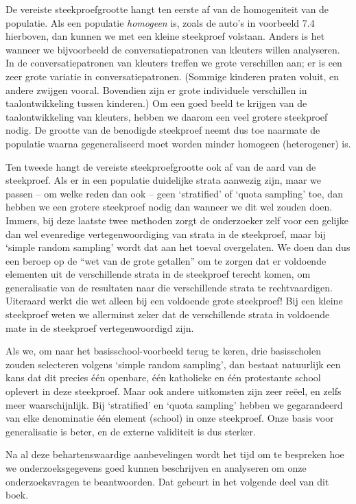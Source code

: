 \documentclass[
]{book}
\begin{document}
De vereiste steekproefgrootte hangt ten eerste af van de homogeniteit
van de populatie. Als een populatie \emph{homogeen} is, zoals de auto's in
voorbeeld 7.4 hierboven, dan kunnen we met een kleine
steekproef volstaan. Anders is het wanneer we bijvoorbeeld de
conversatiepatronen van kleuters willen analyseren. In de
conversatiepatronen van kleuters treffen we grote verschillen aan; er is
een zeer grote variatie in conversatiepatronen. (Sommige kinderen praten
voluit, en andere zwijgen vooral. Bovendien zijn er grote individuele
verschillen in taalontwikkeling tussen kinderen.) Om een goed beeld te
krijgen van de taalontwikkeling van kleuters, hebben we daarom een veel
grotere steekproef nodig. De grootte van de benodigde steekproef neemt
dus toe naarmate de populatie waarna gegeneraliseerd moet worden minder
homogeen (heterogener) is.

Ten tweede hangt de vereiste steekproefgrootte ook af van de aard van de
steekproef. Als er in een populatie duidelijke strata aanwezig zijn,
maar we passen -- om welke reden dan ook -- geen `stratified' of `quota
sampling' toe, dan hebben we een grotere steekproef nodig dan wanneer we
dit wel zouden doen. Immers, bij deze laatste twee methoden zorgt de
onderzoeker zelf voor een gelijke dan wel evenredige vertegenwoordiging
van strata in de steekproef, maar bij `simple random sampling' wordt dat
aan het toeval overgelaten. We doen dan dus een beroep op de ``wet van de
grote getallen'' om te zorgen dat er voldoende elementen uit de
verschillende strata in de steekproef terecht komen, om generalisatie
van de resultaten naar die verschillende strata te rechtvaardigen.
Uiteraard werkt die wet alleen bij een voldoende grote steekproef! Bij
een kleine steekproef weten we allerminst zeker dat de verschillende
strata in voldoende mate in de steekproef vertegenwoordigd zijn.

Als we, om naar het basisschool-voorbeeld terug te keren, drie
basisscholen zouden selecteren volgens `simple random sampling', dan
bestaat natuurlijk een kans dat dit precies één openbare, één katholieke
en één protestante school oplevert in deze steekproef. Maar ook andere
uitkomsten zijn zeer reëel, en zelfs meer waarschijnlijk. Bij
`stratified' en `quota sampling' hebben we gegarandeerd van elke
denominatie één element (school) in onze steekproef. Onze basis voor
generalisatie is beter, en de externe validiteit is dus sterker.

Na al deze behartenswaardige aanbevelingen wordt het tijd om te
bespreken hoe we onderzoeksgegevens goed kunnen beschrijven en
analyseren om onze onderzoeksvragen te beantwoorden. Dat gebeurt in het
volgende deel van dit boek.
\end{document}
